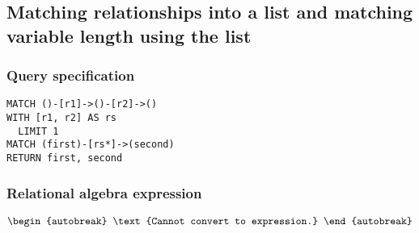 
\subsection{Matching relationships into a list and matching variable length using the list}

\subsubsection*{Query specification}

\begin{lstlisting}
MATCH ()-[r1]->()-[r2]->()
WITH [r1, r2] AS rs
  LIMIT 1
MATCH (first)-[rs*]->(second)
RETURN first, second
\end{lstlisting}

\subsubsection*{Relational algebra expression}

\begin{align*}
\begin{autobreak}
\text{Cannot convert to expression.}
\end{autobreak}
\end{align*}

